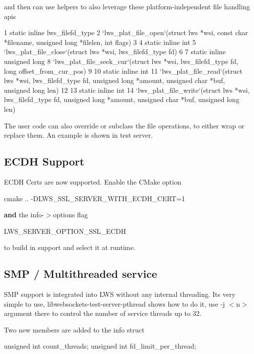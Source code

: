 and then can use helpers to also leverage these platform-\/independent file handling apis


\begin{DoxyCode}
1 static inline lws\_filefd\_type
2 `lws\_plat\_file\_open`(struct lws *wsi, const char *filename, unsigned long *filelen, int flags)
3 
4 static inline int
5 `lws\_plat\_file\_close`(struct lws *wsi, lws\_filefd\_type fd)
6 
7 static inline unsigned long
8 `lws\_plat\_file\_seek\_cur`(struct lws *wsi, lws\_filefd\_type fd, long offset\_from\_cur\_pos)
9 
10 static inline int
11 `lws\_plat\_file\_read`(struct lws *wsi, lws\_filefd\_type fd, unsigned long *amount, unsigned char *buf,
       unsigned long len)
12 
13 static inline int
14 `lws\_plat\_file\_write`(struct lws *wsi, lws\_filefd\_type fd, unsigned long *amount, unsigned char *buf,
       unsigned long len)
\end{DoxyCode}


The user code can also override or subclass the file operations, to either wrap or replace them. An example is shown in test server.

\subsection*{E\+C\+DH Support }

E\+C\+DH Certs are now supported. Enable the C\+Make option \begin{DoxyVerb}    cmake .. -DLWS_SSL_SERVER_WITH_ECDH_CERT=1 
\end{DoxyVerb}


{\bfseries and} the info-\/$>$options flag \begin{DoxyVerb}    LWS_SERVER_OPTION_SSL_ECDH
\end{DoxyVerb}


to build in support and select it at runtime.

\subsection*{S\+MP / Multithreaded service }

S\+MP support is integrated into L\+WS without any internal threading. It\textquotesingle{}s very simple to use, libwebsockets-\/test-\/server-\/pthread shows how to do it, use -\/j $<$n$>$ argument there to control the number of service threads up to 32.

Two new members are added to the info struct \begin{DoxyVerb}    unsigned int count_threads;
    unsigned int fd_limit_per_thread;
\end{DoxyVerb}


